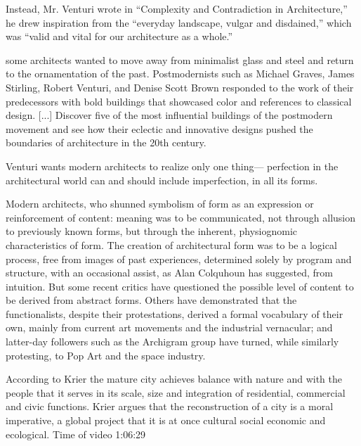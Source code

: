     Instead, Mr. Venturi wrote in “Complexity and Contradiction in Architecture,” he drew inspiration from the “everyday landscape, vulgar and disdained,” which was “valid and vital for our architecture as a whole.”\cite{Schudel2018}

    some architects wanted to move away from minimalist glass and steel and return to the ornamentation of the past. Postmodernists such as Michael Graves, James Stirling, Robert Venturi, and Denise Scott Brown responded to the work of their predecessors with bold buildings that showcased color and references to classical design. [...] Discover five of the most influential buildings of the postmodern movement and see how their eclectic and innovative designs pushed the boundaries of architecture in the 20th century\cite{Stamp2016}.

    Venturi wants modern architects to realize only one thing— perfection in the architectural world can and should include imperfection, in all its forms\cite{Lutolli2020}.



     Modern architects, who shunned symbolism of form  as  an expression or reinforcement of content: meaning was  to  be  communicated,  not  through  allusion  to  previously  known forms, but through the inherent, physiognomic characteristics of form.
    The creation of architectural form was to be a logical process, free  from images  of past experiences, determined solely by program and structure, with an  occasional  assist,  as  Alan Colquhoun has  suggested, from  intuition.
    But some recent critics  have  questioned  the possible level of content to  be derived  from  abstract forms.
    Others have  demonstrated that the functionalists,  despite  their protestations, derived  a  formal vocabulary of their own, mainly from current art movements and the industrial vernacular;
    and  latter-day  followers  such  as  the  Archigram  group  have turned,  while  similarly  protesting,  to Pop  Art and  the space  industry.\cite{Venturi1972}

    According to Krier the mature city achieves balance with nature and with the people that it serves in its scale, size and integration of residential, commercial and civic functions.
    Krier argues that the reconstruction of a city is a moral imperative, a global project that it is at once cultural social economic and ecological. Time of video 1:06:29\cite{Economakis2023}